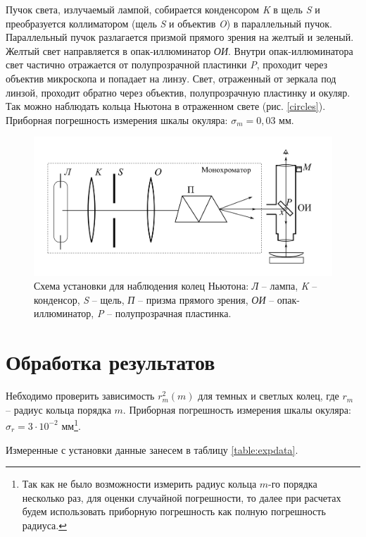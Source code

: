 \documentclass[a4paper,12pt]{article}
\theoremstyle{plain} %
\theoremstyle{definition} %
\theoremstyle{remark} %
\begin{document}
Пучок света, излучаемый лампой, собирается конденсором \textit{K} в щель \textit{S} и преобразуется коллиматором (щель \textit{S} и объектив \textit{O}) в параллельный пучок. Параллельный пучок разлагается призмой прямого зрения на желтый и зеленый. Желтый свет направляется в опак-иллюминатор \textit{ОИ}. Внутри опак-иллюминатора свет частично отражается от полупрозрачной пластинки \textit{P}, проходит через объектив микроскопа и попадает на линзу. Свет, отраженный от зеркала под линзой, проходит обратно через объектив, полупрозрачную пластинку и окуляр. Так можно наблюдать кольца Ньютона в отраженном свете (рис. \ref{circles}). 
Приборная погрешность измерения шкалы окуляра: $\sigma_{m}=0,03$ мм.
\begin{figure}[h]
	\includegraphics[width=1\textwidth,scale=0.8]{facility_pic.png}
	\caption{Схема установки для наблюдения колец Ньютона: \textit{Л} -- лампа, \textit{K} -- конденсор, \textit{S} -- щель, \textit{П} -- призма прямого зрения, \textit{ОИ} -- опак-иллюминатор, \textit{P} -- полупрозрачная пластинка.}
	\label{facility}
	\vspace{5mm}
\end{figure}

\newpage
\section{Обработка результатов}

Небходимо проверить зависимость $r_m^2(m)$ для темных и светлых колец, где $r_m$ -- радиус кольца порядка $m$.
Приборная погрешность измерения шкалы окуляра: $\sigma_r =3\cdot10^{-2}$ мм\footnote{Так как не было возможности измерить радиус кольца $m$-го порядка несколько раз, для оценки случайной погрешности, то далее при расчетах будем использовать приборную погрешность как полную погрешность радиуса.}.

Измеренные с установки данные занесем в таблицу \ref{table:expdata}.
\end{document}
